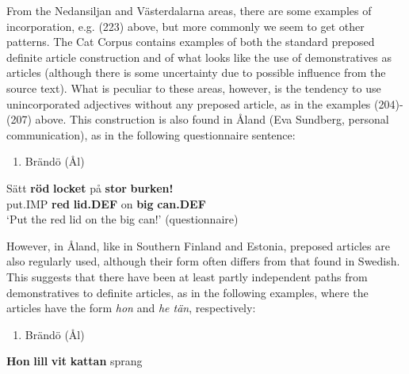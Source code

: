 From the Nedansiljan and Västerdalarna areas, there are some examples of incorporation, e.g. (223) above, but more commonly we seem to get other patterns. The Cat Corpus contains examples of both the standard preposed definite article construction and of what looks like the use of demonstratives as articles (although there is some uncertainty due to possible influence from the source text). What is peculiar to these areas, however, is the tendency to use unincorporated adjectives without any preposed article, as in the examples (204){}-(207) above. This construction is also found in Åland (Eva Sundberg, personal communication), as in the following questionnaire sentence:

\begin{enumerate} %
\item 
Brändö (Ål)

\end{enumerate} %
\ea\label{}
\gll Sätt  \textbf{röd} \textbf{locket} på  \textbf{stor} \textbf{burken!}\\


put.IMP  \textbf{red} \textbf{lid.DEF} on  \textbf{big} \textbf{can.DEF}\\ %


‘Put the red lid on the big can!’ (questionnaire)
\z


However, in Åland, like in Southern Finland and Estonia, preposed articles are also regularly used, although their form often differs from that found in Swedish. This suggests that there have been at least partly independent paths from demonstratives to definite articles, as in the following examples, where the articles have the form \textit{hon} and \textit{he tän}, respectively:

\begin{enumerate} %
\item 
Brändö (Ål)

\end{enumerate} %
\ea\label{}
\gll \textbf{Hon} \textbf{lill} \textbf{vit} \textbf{kattan} sprang\\


